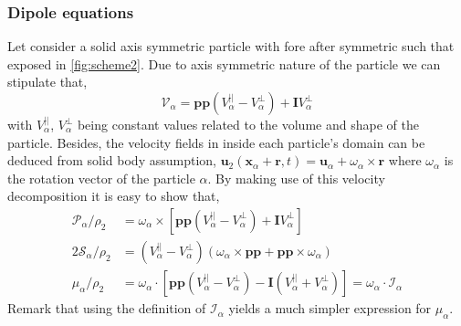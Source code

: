 \subsubsection*{Dipole equations}
Let consider a solid axis symmetric particle with fore after symmetric such that exposed in \ref{fig:scheme2}. 
Due to axis symmetric nature of the particle we can stipulate that, 
\begin{equation}
    \mathcal{V}_\alpha =  \textbf{pp} (V_\alpha^{||} - V_\alpha^\bot) 
    +  \textbf{I} V_\alpha^\bot
    \label{eq:V_definition}
\end{equation}
with $V_\alpha^{||}$, $V_\alpha^\bot$ being constant values related to the volume and shape of the particle. 
Besides, the velocity fields in inside each particle's domain can be deduced from solid body assumption, $\textbf{u}_2(\textbf{x}_\alpha + \textbf{r},t) = \textbf{u}_\alpha + \omega_\alpha \times \textbf{r}$ where $\omega_\alpha$ is the rotation vector of the particle $\alpha$.
By making use of this velocity decomposition it is easy to show that,
\begin{align}
    \mathcal{P}_\alpha/\rho_2
    &=  \omega_\alpha \times \left[
        \textbf{pp}(V_\alpha^{||} - V_\alpha^\bot) 
        + \textbf{I} V_\alpha^\bot
    \right]
    \label{eq:P_edfinition}\\
    2\mathcal{S}_\alpha/\rho_2
    &=  (V_\alpha^{||} - V_\alpha^\bot) \left(
        \omega_\alpha \times
        \textbf{pp}
        + \textbf{pp} \times \omega_\alpha
    \right)
    \label{eq:S_definition}\\
    \mu_\alpha / \rho_2
    &= \omega_\alpha \cdot \left[
        \textbf{pp} 
    (V_\alpha^{||}  - V_\alpha^{\bot} ) 
    - \textbf{I}(V_\alpha^{||} + V_\alpha^{\bot})
    \right]
    = \omega_\alpha \cdot\mathcal{I}_\alpha
    \label{eq:mu_definition}
\end{align}
Remark that  using the definition of $\mathcal{I}_\alpha$ yields a much simpler expression for $\mu_\alpha$. 

